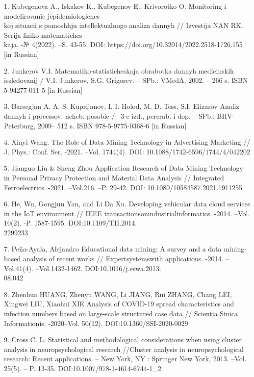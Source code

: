 \begin{noparindent}

1. Kubegenova A., Iskakov K., Kubegenov E., Krivorot\textquotesingle ko
O. Monitoring i modelirovanie jepidemiologiches\\koj situacii s
pomoshh\textquotesingle ju intellektual\textquotesingle nogo analiza
dannyh // Izvestija NAN RK. Serija fiziko-matematiches\\kaja. -№ 4(2022).
--S. 43-55. DOI: https://doi.org/10.32014/2022.2518-1726.155 {[}in
Russian{]}

2. Junkerov V.I. Matematiko-statisticheskaja obrabotka dannyh
medicinskih issledovanij / V.I. Junkerov, S.G.
Grigor\textquotesingle ev. -- SPb.: VMedA, 2002. -- 266 s. ISBN
5-94277-011-5 {[}in Russian{]}

3. Barsegjan A. A. S. Kuprijanov, I. I. Holod, M. D. Tess, S.I. Elizarov
Analiz dannyh i processov: ucheb. posobie /-- 3-e izd., pererab. i dop.
-- SPb.: BHV-Peterburg, 2009-- 512 s. ISBN 978-5-9775-0368-6 {[}in
Russian{]}

4. Xinyi Wang. The Role of Data Mining Technology in Advertising
Marketing // J. Phys.: Conf. Ser. -2021. --Vol. 1744(4). DOI:
10.1088/1742-6596/1744/4/042202

5. Jianguo Liu \& Sheng Zhou Application Research of Data Mining
Technology in Personal Privacy Protection and Material Data Analysis //
Integrated Ferroelectrics. -2021. --Vol.216. --P. 29-42. DOI:
10.1080/10584587.2021.1911255

6. He, Wu, Gongjun Yan, and Li Da Xu. Developing vehicular data cloud
services in the IoT environment // IEEE
transactionsonindustrialinformatics. -2014. --Vol. 10(2). -P. 1587-1595.
DOI:10.1109/TII.2014.\\2299233

7. Peña-Ayala, Alejandro Educational data mining: A survey and a data
mining-based analysis of recent works // Expertsystemswith applications.
-2014. --Vol.41(4). --Vol.1432-1462. DOI:10.1016/j.eswa.2013.\\08.042

8. Zhenhua HUANG, Zhenyu WANG, Li JIANG, Rui ZHANG, Chang LEI, Xingwei
LIU, Xiaohui XIE Analysis of COVID-19 spread characteristics and
infection numbers based on large-scale structured case data // Scientia
Sinica Informationis. -2020--Vol. 50(12). DOI:10.1360/SSI-2020-0029

9. Cross C. L. Statistical and methodological considerations when using
cluster analysis in neuropsychological research //Cluster analysis in
neuropsychological research: Recent applications. -- New York, NY :
Springer New York, 2013. --Vol. 25(5). -- P. 13-35.
DOI:10.1007/978-1-4614-6744-1\_2


\end{noparindent}

